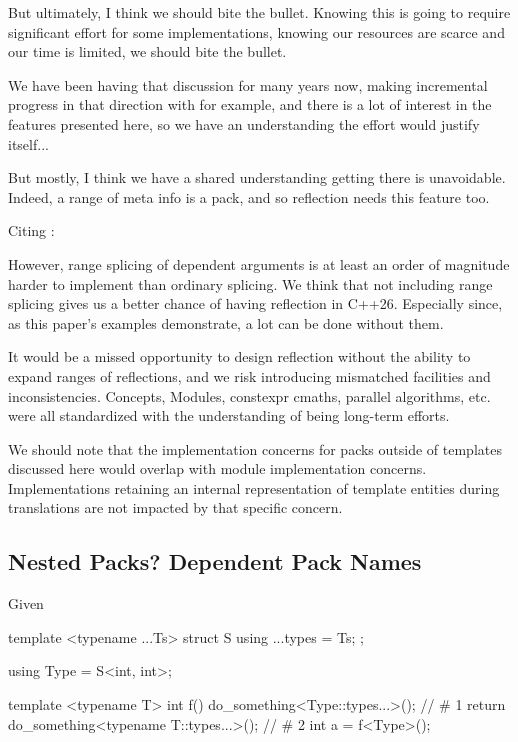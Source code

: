 \documentclass{wg21}
\begin{document}
But ultimately, I think we should bite the bullet.
Knowing this is going to require significant effort for some implementations, knowing our resources are scarce and our time is limited, we should bite the bullet.

We have been having that discussion for many years now, making incremental progress in that direction with  for example,
and there is a lot of interest in the features presented here, so we have an understanding the effort would justify itself...

But mostly, I think we have a shared understanding getting there is unavoidable.
Indeed, a range of meta info is a pack, and so reflection needs this feature too.

Citing :

\begin{quoteblock}
However, range splicing of dependent arguments is at least an order of magnitude harder to implement than ordinary splicing. We think that not including range splicing gives us a better chance of having reflection in C++26. Especially since, as this paper’s examples demonstrate, a lot can be done without them.
\end{quoteblock}

It would be a missed opportunity to design reflection without the ability to expand ranges of reflections, and we risk introducing mismatched facilities and inconsistencies.
Concepts, Modules, constexpr cmaths, parallel algorithms, etc. were all standardized with the understanding of being long-term efforts.

We should note that the implementation concerns for packs outside of templates discussed here would overlap with module implementation concerns.
Implementations retaining an internal representation of template entities during translations are not impacted by that specific concern.

\subsection{Nested Packs? Dependent Pack Names}

Given

\begin{colorblock}
template <typename ...Ts>
struct S {
    using ...types = Ts;
};

using Type = S<int, int>;

template <typename T>
int f() {
    do_something<Type::types...>(); // # 1
    return do_something<typename T::types...>(); // # 2
}
int a = f<Type>();
\end{colorblock}
\end{document}
